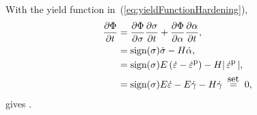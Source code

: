 With the yield function in~(\ref{eq:yieldFunctionHardening}),
\begin{align}
 \frac{\partial \Phi}{\partial t} 
  &=  \displaystyle\frac{\partial \Phi}{\partial \sigma} 
  \displaystyle\frac{\partial \sigma}{\partial t} 
  +\displaystyle\frac{\partial \Phi}{\partial \alpha} 
  \displaystyle\frac{\partial \alpha}{\partial t}, \nonumber \nonumber \\
  &= \mbox{sign}(\sigma) \dot{\sigma} - H \dot{\alpha}, \nonumber \\
  &= \mbox{sign}(\sigma) E \left( \dot{\varepsilon} - \dot{\varepsilon}^{\mbox{\footnotesize p}} \right) 
  - H | \, \dot{\varepsilon}^{\mbox{\footnotesize p}} \, |, \nonumber \\
  &= \mbox{sign}(\sigma) E \dot{\varepsilon} - E \dot{\gamma} - H \dot{\gamma} \; \stackrel{\mbox{set}}{=} \;  0, 
\end{align}
gives
\be
 .
 \label{eq:gammaDotHardening}
\ee
